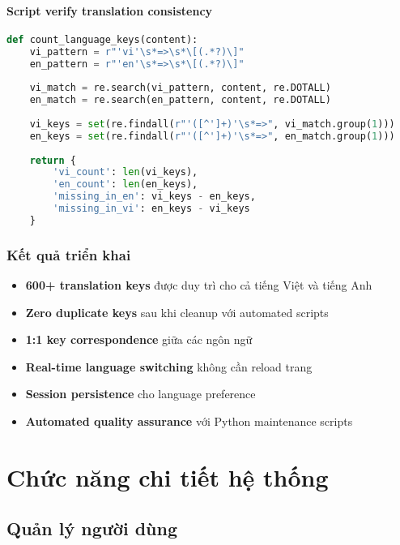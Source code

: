 \documentclass[12pt,a4paper]{report}
\begin{document}
\subsubsection{Script verify translation consistency}
\begin{lstlisting}[language=Python, caption=count\_keys.py]
def count_language_keys(content):
    vi_pattern = r"'vi'\s*=>\s*\[(.*?)\]"
    en_pattern = r"'en'\s*=>\s*\[(.*?)\]"
    
    vi_match = re.search(vi_pattern, content, re.DOTALL)
    en_match = re.search(en_pattern, content, re.DOTALL)
    
    vi_keys = set(re.findall(r"'([^']+)'\s*=>", vi_match.group(1)))
    en_keys = set(re.findall(r"'([^']+)'\s*=>", en_match.group(1)))
    
    return {
        'vi_count': len(vi_keys),
        'en_count': len(en_keys), 
        'missing_in_en': vi_keys - en_keys,
        'missing_in_vi': en_keys - vi_keys
    }
\end{lstlisting}

\subsection{Kết quả triển khai}
\begin{itemize}
    \item \textbf{600+ translation keys} được duy trì cho cả tiếng Việt và tiếng Anh
    \item \textbf{Zero duplicate keys} sau khi cleanup với automated scripts
    \item \textbf{1:1 key correspondence} giữa các ngôn ngữ
    \item \textbf{Real-time language switching} không cần reload trang
    \item \textbf{Session persistence} cho language preference
    \item \textbf{Automated quality assurance} với Python maintenance scripts
\end{itemize}

\chapter{Chức năng chi tiết hệ thống}

\section{Quản lý người dùng}
\end{document}
